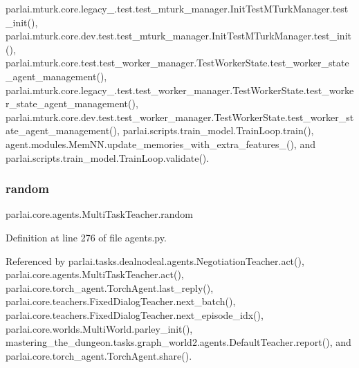 parlai.\+mturk.\+core.\+legacy\+\_.\+test.\+test\+\_\+mturk\+\_\+manager.\+Init\+Test\+M\+Turk\+Manager.\+test\+\_\+init(), parlai.\+mturk.\+core.\+dev.\+test.\+test\+\_\+mturk\+\_\+manager.\+Init\+Test\+M\+Turk\+Manager.\+test\+\_\+init(), parlai.\+mturk.\+core.\+test.\+test\+\_\+worker\+\_\+manager.\+Test\+Worker\+State.\+test\+\_\+worker\+\_\+state\+\_\+agent\+\_\+management(), parlai.\+mturk.\+core.\+legacy\+\_.\+test.\+test\+\_\+worker\+\_\+manager.\+Test\+Worker\+State.\+test\+\_\+worker\+\_\+state\+\_\+agent\+\_\+management(), parlai.\+mturk.\+core.\+dev.\+test.\+test\+\_\+worker\+\_\+manager.\+Test\+Worker\+State.\+test\+\_\+worker\+\_\+state\+\_\+agent\+\_\+management(), parlai.\+scripts.\+train\+\_\+model.\+Train\+Loop.\+train(), agent.\+modules.\+Mem\+N\+N.\+update\+\_\+memories\+\_\+with\+\_\+extra\+\_\+features\+\_\+(), and parlai.\+scripts.\+train\+\_\+model.\+Train\+Loop.\+validate().

\mbox{\label{classparlai_1_1core_1_1agents_1_1MultiTaskTeacher_a4bf83cc6d6e942b257ac249745bae007}} 
\subsubsection{\texorpdfstring{random}{random}}
{\footnotesize\ttfamily parlai.\+core.\+agents.\+Multi\+Task\+Teacher.\+random}



Definition at line 276 of file agents.\+py.



Referenced by parlai.\+tasks.\+dealnodeal.\+agents.\+Negotiation\+Teacher.\+act(), parlai.\+core.\+agents.\+Multi\+Task\+Teacher.\+act(), parlai.\+core.\+torch\+\_\+agent.\+Torch\+Agent.\+last\+\_\+reply(), parlai.\+core.\+teachers.\+Fixed\+Dialog\+Teacher.\+next\+\_\+batch(), parlai.\+core.\+teachers.\+Fixed\+Dialog\+Teacher.\+next\+\_\+episode\+\_\+idx(), parlai.\+core.\+worlds.\+Multi\+World.\+parley\+\_\+init(), mastering\+\_\+the\+\_\+dungeon.\+tasks.\+graph\+\_\+world2.\+agents.\+Default\+Teacher.\+report(), and parlai.\+core.\+torch\+\_\+agent.\+Torch\+Agent.\+share().

\mbox{\label{classparlai_1_1core_1_1agents_1_1MultiTaskTeacher_ae142e91e45c96fabf73d73639db3ab18}} 
